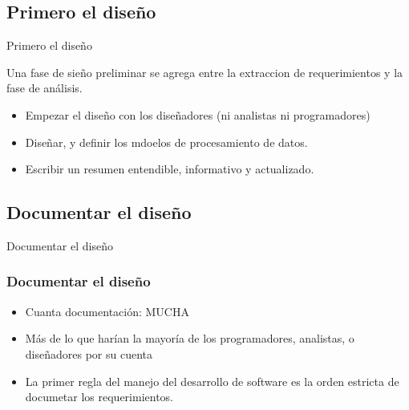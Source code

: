 \documentclass{beamer}
\begin{document}
\subsection{Primero el diseño}

\begin{frame}{Primero el diseño}

Una fase de sieño preliminar se agrega entre la extraccion de requerimientos y la fase de análisis.

\begin{itemize}
\item Empezar el diseño con los diseñadores (ni analistas ni programadores)
\item Diseñar, y definir los mdoelos de procesamiento de datos.
\item Escribir un resumen entendible, informativo y actualizado.

\end{itemize}

\end{frame}

\subsection{Documentar el diseño}


\begin{frame}{Documentar el diseño}
\frametitle{Documentar el diseño}

\begin{itemize}
\item Cuanta documentación: MUCHA
\item Más de lo que harían la mayoría de los programadores, analistas, o diseñadores por su cuenta
\item La primer regla del manejo del desarrollo de  software es la orden estricta de documetar los requerimientos.

\end{itemize}

\end{frame}
\end{document}
